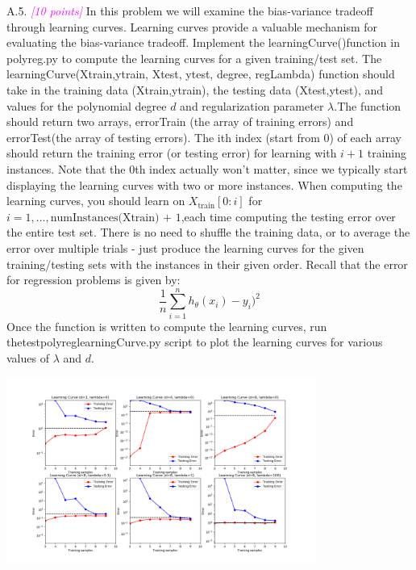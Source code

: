 \documentclass{article}
\newcommand{\1}{\mathbf{1}}
\newcommand{\points}[1]{\small\textcolor{magenta}{\emph{[#1 points]}} \normalsize}
\begin{document}
\newpage
A.5. \points{10} In this problem we will examine the bias-variance tradeoff through learning curves. Learning curves provide a valuable mechanism for evaluating the bias-variance tradeoff. Implement the learningCurve()function in polyreg.py to compute the learning curves for a given training/test set. The learningCurve(Xtrain,ytrain, Xtest, ytest, degree, regLambda) function should take in the training data (Xtrain,ytrain), the testing data (Xtest,ytest), and values for the polynomial degree $d$ and regularization parameter $\lambda$.The function should return two arrays, errorTrain (the array of training errors) and errorTest(the array of testing errors). The ith index (start from 0) of each array should return the training error (or testing error) for learning with $i+1$ training instances. Note that the 0th index actually won’t matter, since we typically start displaying the learning curves with two or more instances. When computing the learning curves, you should learn on $X_\text{train}[0:i]$ for $i= 1,...,\text{numInstances(Xtrain) + 1}$,each time computing the testing error over the entire test set. There is no need to shuffle the training data, or to average the error over multiple trials - just produce the learning curves for the given training/testing sets with the instances in their given order. Recall that the error for regression problems is given by:
$$\frac{1}{n}\sum_{i=1}^n h_\theta (x_i) - y_i)^2 $$
Once the function is written to compute the learning curves, run thetestpolyreglearningCurve.py script to plot the learning curves for various values of $\lambda$ and $d$.\\
\begin{center}
    \includegraphics[width=4in]{HW1/HW1_plots/LearningCurves.png}
\end{center} 
\end{document}

